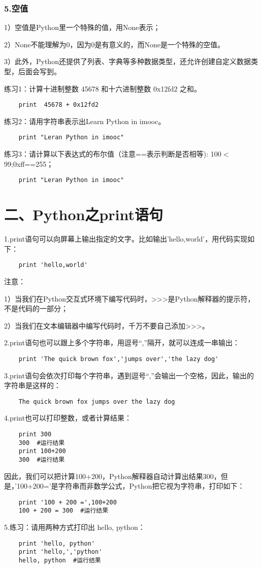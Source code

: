 \documentclass{article}
\begin{document}
\begin{CJK}{UTF8}{gbsn}
\section*{5.空值}
\subparagraph*{}
1）空值是Python里一个特殊的值，用None表示；
\subparagraph*{}
2）None不能理解为0，因为0是有意义的，而None是一个特殊的空值。
\subparagraph*{}
3）此外，Python还提供了列表、字典等多种数据类型，还允许创建自定义数据类型，后面会写到。
\subparagraph*{}
练习1：计算十进制整数 45678 和十六进制整数 0x12fd2 之和。
\begin{verbatim}
    print  45678 + 0x12fd2
\end{verbatim}
\subparagraph*{}
练习2：请用字符串表示出Learn Python in imooc。
\begin{verbatim}
    print "Leran Python in imooc"
\end{verbatim}
\subparagraph*{}
练习3：请计算以下表达式的布尔值（注意==表示判断是否相等):
100$<$99;0xff==255；
\begin{verbatim}
    print "Leran Python in imooc"
\end{verbatim}
\part*{二、Python之print语句}
\subparagraph*{}
1.print语句可以向屏幕上输出指定的文字。比如输出'hello,world'，用代码实现如下：
\begin{verbatim}
    print 'hello,world'
\end{verbatim}
\subparagraph*{}
注意：
\subparagraph*{}
1）当我们在Python交互式环境下编写代码时，>>>是Python解释器的提示符，不是代码的一部分；
\subparagraph*{}
2）当我们在文本编辑器中编写代码时，千万不要自己添加>>>。
\subparagraph*{}
2.print语句也可以跟上多个字符串，用逗号“,”隔开，就可以连成一串输出：
\begin{verbatim}
    print 'The quick brown fox','jumps over','the lazy dog'
\end{verbatim}
\subparagraph*{}
3.print语句会依次打印每个字符串，遇到逗号“,”会输出一个空格，因此，输出的字符串是这样的：
\begin{verbatim}
    The quick brown fox jumps over the lazy dog
\end{verbatim}
\subparagraph*{}
4.print也可以打印整数，或者计算结果：
\begin{verbatim}
    print 300
    300  #运行结果
    print 100+200
    300  #运行结果
\end{verbatim}
\subparagraph*{}
因此，我们可以把计算100+200，Python解释器自动计算出结果300，但是，'100+200='是字符串而非数学公式，Python把它视为字符串，打印如下：
\begin{verbatim}
    print '100 + 200 =',100+200
    100 + 200 = 300  #运行结果
\end{verbatim}
\subparagraph*{}
5.练习：请用两种方式打印出 hello, python：
\begin{verbatim}
    print 'hello, python'
    print 'hello,','python'
    hello, python  #运行结果
\end{verbatim}

\end{CJK}
\end{document}
